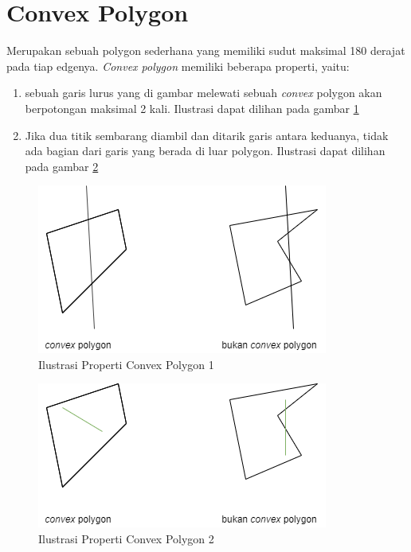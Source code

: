 \section{Convex Polygon}
Merupakan sebuah polygon sederhana yang memiliki sudut maksimal 180 derajat pada tiap edgenya. \textit{Convex polygon} memiliki beberapa properti, yaitu:
\begin{enumerate}
    \item sebuah garis lurus yang di gambar melewati sebuah \textit{convex} polygon akan berpotongan maksimal 2 kali. Ilustrasi dapat dilihan pada gambar \ref{fig:ilustrasi-properti-convex-polygon-1}
    \item Jika dua titik sembarang diambil dan ditarik garis antara keduanya, tidak ada bagian dari garis yang berada di luar polygon. Ilustrasi dapat dilihan pada gambar \ref{fig:ilustrasi-properti-convex-polygon-2}
\end{enumerate}
\begin{figure}
    \Centering
    \includegraphics[width=0.5\columnwidth]{bab2/img/ilustrasi-properti-convex-polygon-1}
    \caption{Ilustrasi Properti Convex Polygon 1}
    \label{fig:ilustrasi-properti-convex-polygon-1}
\end{figure}
\begin{figure}
    \Centering
    \includegraphics[width=0.5\columnwidth]{bab2/img/ilustrasi-properti-convex-polygon-2}
    \caption{Ilustrasi Properti Convex Polygon 2}
    \label{fig:ilustrasi-properti-convex-polygon-2}
\end{figure}


